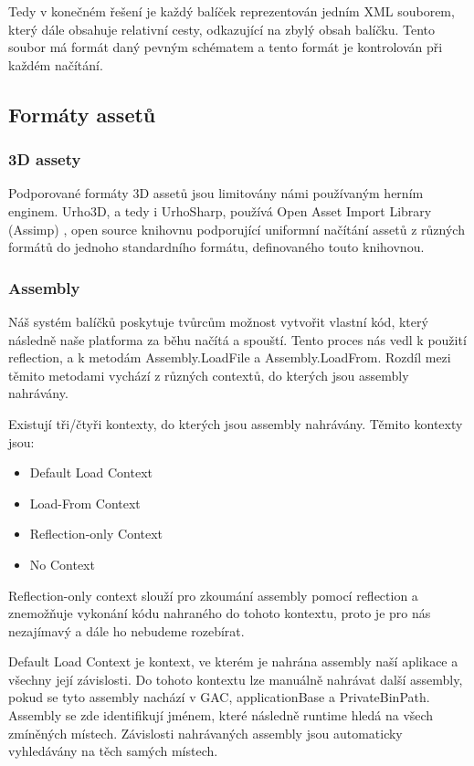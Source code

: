 Tedy v konečném řešení je každý balíček reprezentován jedním XML souborem, který dále obsahuje relativní cesty, odkazující na zbylý obsah balíčku. Tento soubor má formát daný pevným schématem a tento formát je kontrolován při každém načítání. 

\subsection{Formáty assetů}
\subsubsection{3D assety}
Podporované formáty 3D assetů jsou limitovány námi používaným herním enginem. Urho3D, a tedy i UrhoSharp, používá Open Asset Import Library (Assimp) \citep{site:assimp}, open source knihovnu podporující uniformní načítání assetů z různých formátů do jednoho standardního formátu, definovaného touto knihovnou.
\subsubsection{Assembly}
Náš systém balíčků poskytuje tvůrcům možnost vytvořit vlastní kód, který následně naše platforma za běhu načítá a spouští. Tento proces nás vedl k použití reflection, a k metodám Assembly.LoadFile a Assembly.LoadFrom. Rozdíl mezi těmito metodami vychází z různých contextů, do kterých jsou assembly nahrávány. 

Existují tři/čtyři kontexty, do kterých jsou assembly nahrávány. Těmito kontexty jsou\citep{site:assemblyload}:
\begin{itemize}
	\item Default Load Context
	\item Load-From Context
	\item Reflection-only Context
	\item No Context
\end{itemize}

Reflection-only context slouží pro zkoumání assembly pomocí reflection a znemožňuje vykonání kódu nahraného do tohoto kontextu, proto je pro nás nezajímavý a dále ho nebudeme rozebírat.

Default Load Context je kontext, ve kterém je nahrána assembly naší aplikace a všechny její závislosti. Do tohoto kontextu lze manuálně nahrávat další assembly, pokud se tyto assembly nachází v GAC, applicationBase a PrivateBinPath. Assembly se zde identifikují jménem, které následně runtime hledá na všech zmíněných místech. Závislosti nahrávaných assembly jsou automaticky vyhledávány na těch samých místech.


